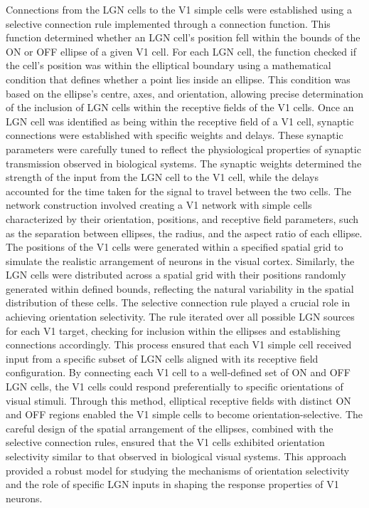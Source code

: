 \documentclass[12pt]{article}
\begin{document}
\noindent Connections from the LGN cells to the V1 simple cells were established using a selective connection rule implemented through a connection function. This function determined whether an LGN cell's position fell within the bounds of the ON or OFF ellipse of a given V1 cell. For each LGN cell, the function checked if the cell's position was within the elliptical boundary using a mathematical condition that defines whether a point lies inside an ellipse. This condition was based on the ellipse's centre, axes, and orientation, allowing precise determination of the inclusion of LGN cells within the receptive fields of the V1 cells. Once an LGN cell was identified as being within the receptive field of a V1 cell, synaptic connections were established with specific weights and delays. These synaptic parameters were carefully tuned to reflect the physiological properties of synaptic transmission observed in biological systems. The synaptic weights determined the strength of the input from the LGN cell to the V1 cell, while the delays accounted for the time taken for the signal to travel between the two cells. The network construction involved creating a V1 network with simple cells characterized by their orientation, positions, and receptive field parameters, such as the separation between ellipses, the radius, and the aspect ratio of each ellipse. The positions of the V1 cells were generated within a specified spatial grid to simulate the realistic arrangement of neurons in the visual cortex. Similarly, the LGN cells were distributed across a spatial grid with their positions randomly generated within defined bounds, reflecting the natural variability in the spatial distribution of these cells. The selective connection rule played a crucial role in achieving orientation selectivity. The rule iterated over all possible LGN sources for each V1 target, checking for inclusion within the ellipses and establishing connections accordingly. This process ensured that each V1 simple cell received input from a specific subset of LGN cells aligned with its receptive field configuration. By connecting each V1 cell to a well-defined set of ON and OFF LGN cells, the V1 cells could respond preferentially to specific orientations of visual stimuli. Through this method, elliptical receptive fields with distinct ON and OFF regions enabled the V1 simple cells to become orientation-selective. The careful design of the spatial arrangement of the ellipses, combined with the selective connection rules, ensured that the V1 cells exhibited orientation selectivity similar to that observed in biological visual systems. This approach provided a robust model for studying the mechanisms of orientation selectivity and the role of specific LGN inputs in shaping the response properties of V1 neurons.
\end{document}
